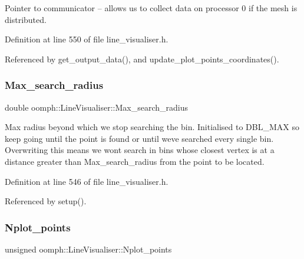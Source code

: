 Pointer to communicator -- allows us to collect data on processor 0 if the mesh is distributed. 



Definition at line 550 of file line\+\_\+visualiser.\+h.



Referenced by get\+\_\+output\+\_\+data(), and update\+\_\+plot\+\_\+points\+\_\+coordinates().

\mbox{\label{classoomph_1_1LineVisualiser_abfcd8512571fba22e22b1952823c8744}} 
\subsubsection{\texorpdfstring{Max\+\_\+search\+\_\+radius}{Max\_search\_radius}}
{\footnotesize\ttfamily double oomph\+::\+Line\+Visualiser\+::\+Max\+\_\+search\+\_\+radius\hspace{0.3cm}{\ttfamily [private]}}



Max radius beyond which we stop searching the bin. Initialised to D\+B\+L\+\_\+\+M\+AX so keep going until the point is found or until we\textquotesingle{}ve searched every single bin. Overwriting this means we won\textquotesingle{}t search in bins whose closest vertex is at a distance greater than Max\+\_\+search\+\_\+radius from the point to be located. 



Definition at line 546 of file line\+\_\+visualiser.\+h.



Referenced by setup().

\mbox{\label{classoomph_1_1LineVisualiser_a6786384d0c0c0de6df02b2b9a34a298a}} 
\subsubsection{\texorpdfstring{Nplot\+\_\+points}{Nplot\_points}}
{\footnotesize\ttfamily unsigned oomph\+::\+Line\+Visualiser\+::\+Nplot\+\_\+points\hspace{0.3cm}{\ttfamily [private]}}



